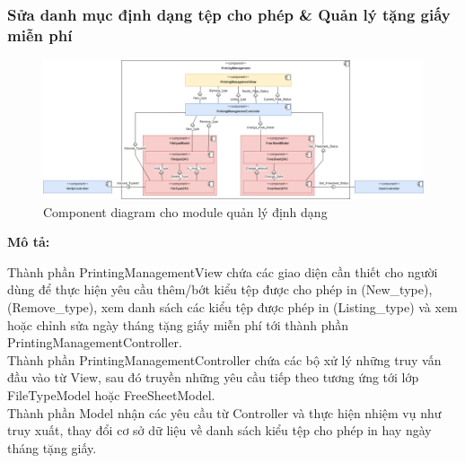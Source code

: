 \subsubsection{Sửa danh mục định dạng tệp cho phép \& Quản lý tặng giấy miễn phí}

\begin{figure}[H]
    \begin{center}        
    \includegraphics[width=1\textwidth]{Images/Architecture Design/PS_Component.png}
        \caption{Component diagram cho module quản lý định dạng}
        \label{fig:arch}
    \end{center}
\end{figure}

\textbf{Mô tả:}\par
Thành phần PrintingManagementView chứa các giao diện cần thiết cho người dùng để thực hiện yêu cầu thêm/bớt kiểu tệp được cho phép in (New\_type), (Remove\_type), xem danh sách các kiểu tệp được phép in (Listing\_type) và xem hoặc chỉnh sửa ngày tháng tặng giấy miễn phí tới thành phần PrintingManagementController. \\
Thành phần PrintingManagementController chứa các bộ xử lý những truy vấn đầu vào từ View, sau đó truyền những yêu cầu tiếp theo tương ứng tới lớp FileTypeModel hoặc FreeSheetModel. \\
Thành phần Model nhận các yêu cầu từ Controller và thực hiện nhiệm vụ như truy xuất, thay đổi cơ sở dữ liệu về danh sách kiểu tệp cho phép in hay ngày tháng tặng giấy.

